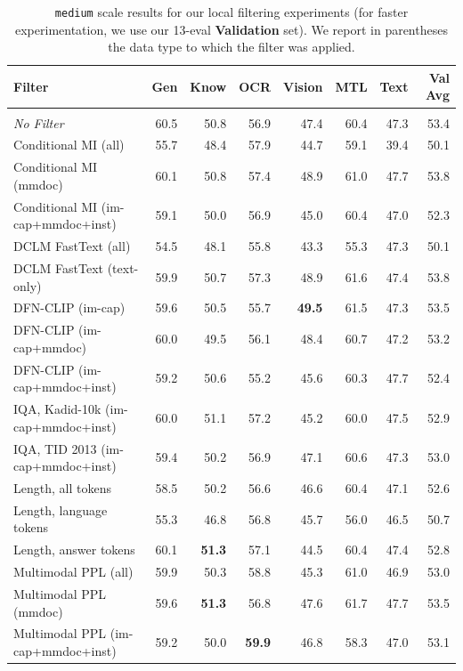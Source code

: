 \begin{table}
\centering
\caption{\texttt{medium} scale results for our local filtering experiments (for faster experimentation, we use our 13-eval \textbf{Validation} set). We report in parentheses the data type to which the filter was applied.}
\label{tab:local-filtering-val-medium}
\small
\begin{tabular}{lrrrrrrr}
\toprule
\textbf{Filter} & \textbf{Gen} & \textbf{Know} & \textbf{OCR} & \textbf{Vision} & \textbf{MTL} & \textbf{Text} & \textbf{Val Avg} \\
\midrule
\rowcolor{gray!8} \multicolumn{8}{l}{\texttt{medium} scale} \\
\midrule
\textit{No Filter} & 60.5 & 50.8 & 56.9 & 47.4 & 60.4 & 47.3 & 53.4 \\
Conditional MI (all) & 55.7 & 48.4 & 57.9 & 44.7 & 59.1 & 39.4 & 50.1 \\
Conditional MI (mmdoc) & 60.1 & 50.8 & 57.4 & 48.9 & 61.0 & 47.7 & 53.8 \\
Conditional MI (im-cap+mmdoc+inst) & 59.1 & 50.0 & 56.9 & 45.0 & 60.4 & 47.0 & 52.3 \\
DCLM FastText (all) & 54.5 & 48.1 & 55.8 & 43.3 & 55.3 & 47.3 & 50.1 \\
DCLM FastText (text-only) & 59.9 & 50.7 & 57.3 & 48.9 & 61.6 & 47.4 & 53.8 \\
DFN-CLIP (im-cap) & 59.6 & 50.5 & 55.7 & \textbf{49.5} & 61.5 & 47.3 & 53.5 \\
DFN-CLIP (im-cap+mmdoc) & 60.0 & 49.5 & 56.1 & 48.4 & 60.7 & 47.2 & 53.2 \\
DFN-CLIP (im-cap+mmdoc+inst) & 59.2 & 50.6 & 55.2 & 45.6 & 60.3 & 47.7 & 52.4 \\
IQA, Kadid-10k (im-cap+mmdoc+inst) & 60.0 & 51.1 & 57.2 & 45.2 & 60.0 & 47.5 & 52.9 \\
IQA, TID 2013 (im-cap+mmdoc+inst) & 59.4 & 50.2 & 56.9 & 47.1 & 60.6 & 47.3 & 53.0 \\
Length, all tokens & 58.5 & 50.2 & 56.6 & 46.6 & 60.4 & 47.1 & 52.6 \\
Length, language tokens & 55.3 & 46.8 & 56.8 & 45.7 & 56.0 & 46.5 & 50.7 \\
Length, answer tokens & 60.1 & \textbf{51.3} & 57.1 & 44.5 & 60.4 & 47.4 & 52.8 \\
Multimodal PPL (all) & 59.9 & 50.3 & 58.8 & 45.3 & 61.0 & 46.9 & 53.0 \\
Multimodal PPL (mmdoc) & 59.6 & \textbf{51.3} & 56.8 & 47.6 & 61.7 & 47.7 & 53.5 \\
Multimodal PPL (im-cap+mmdoc+inst) & 59.2 & 50.0 & \textbf{59.9} & 46.8 & 58.3 & 47.0 & 53.1 \\

\end{tabular}
\end{table}
